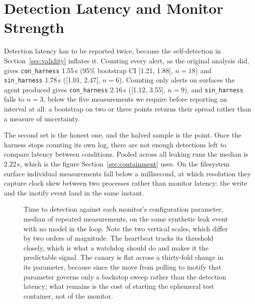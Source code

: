 \section{Detection Latency and Monitor Strength}
\label{sec:latency}


Detection latency has to be reported twice, because the self-detection in
Section~\ref{sec:validity} inflates it. Counting every alert, as the original
analysis did, gives \texttt{con\_harness} 1.55\,s (95\% bootstrap CI
[1.21, 1.88], $n{=}18$) and \texttt{sin\_harness} 1.78\,s ([1.01, 2.47],
$n{=}6$). Counting only alerts on surfaces the agent produced gives
\texttt{con\_harness} 2.16\,s ([1.12, 3.55], $n{=}9$), and
\texttt{sin\_harness} falls to $n{=}3$, below the five measurements we
require before reporting an interval at all: a bootstrap on two or three
points returns their spread rather than a measure of uncertainty.

The second set is the honest one, and the halved sample is the point. Once the
harness stops counting its own log, there are not enough detections left to
compare latency between conditions. Pooled across all leaking runs the median
is 2.22\,s, which is the figure Section~\ref{sec:containment} uses. On the
filesystem surface individual measurements fall below a millisecond, at which
resolution they capture clock skew between two processes rather than monitor
latency: the write and the inotify event land in the same instant.

\begin{figure}[t]
\centering
\resizebox{\textwidth}{!}{}
\caption{Time to detection against each monitor's configuration parameter,
median of repeated measurements, on the same synthetic leak event with no
model in the loop. Note the two vertical scales, which differ by two orders of
magnitude. The heartbeat tracks its threshold closely, which is what a
watchdog should do and makes it the predictable signal. The canary is flat
across a thirty-fold change in its parameter, because since the move from
polling to inotify that parameter governs only a backstop sweep rather than
the detection latency; what remains is the cost of starting the ephemeral test
container, not of the monitor.}
\label{fig:sweep}
\end{figure}
